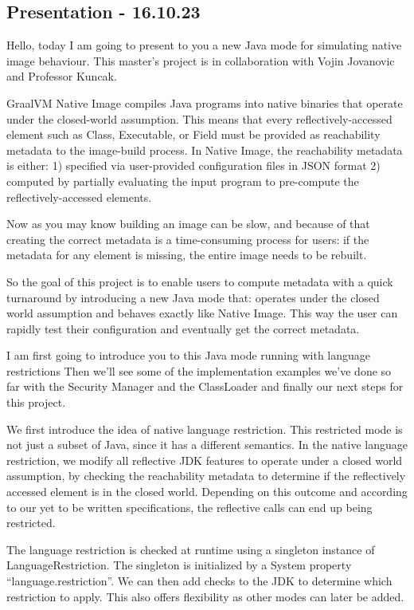 \subsection{Presentation - 16.10.23}
Hello, today I am going to present to you a new Java mode for simulating native image behaviour. This master’s project is in collaboration with Vojin Jovanovic and Professor Kuncak.

GraalVM Native Image compiles Java programs into native binaries that operate under the closed-world assumption. This means that every reflectively-accessed element such as Class, Executable, or Field must be provided as reachability metadata to the image-build process. 
In Native Image, the reachability metadata is either: 
  1) specified via user-provided configuration files in JSON format
  2) computed by partially evaluating the input program to pre-compute the reflectively-accessed elements.

Now as you may know building an image can be slow, and because of that creating the correct metadata is a time-consuming process for users: if the metadata for any element is missing, the entire image needs to be rebuilt.

So the goal of this project is to enable users to compute metadata with a quick turnaround by introducing a new Java mode that: operates under the closed world assumption and behaves exactly like Native Image. This way the user can rapidly test their configuration and eventually get the correct metadata. 

I am first going to introduce you to this Java mode running with language restrictions
Then we’ll see some of the implementation examples we’ve done so far with the Security Manager and the ClassLoader and finally our next steps for this project.

We first introduce the idea of native language restriction. This restricted mode is not just a subset of Java, since it has a different semantics. 
In the native language restriction, we modify all reflective JDK features to operate under a closed world assumption, by checking the reachability metadata to determine if the reflectively accessed element is in the closed world. Depending on this outcome and according to our yet to be written specifications, the reflective calls can end up being restricted.

The language restriction is checked at runtime using a singleton instance of LanguageRestriction. The singleton is initialized by a System property “language.restriction”.
We can then add checks to the JDK to determine which restriction to apply. This also offers flexibility as other modes can later be added.



